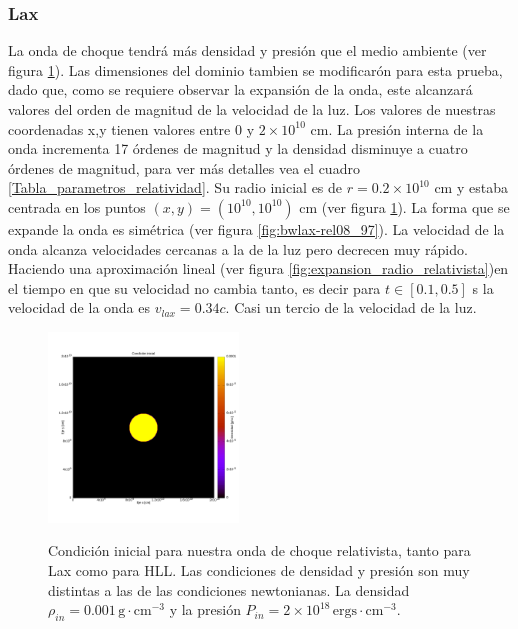 \documentclass[12pt,a4paper]{book}
\begin{document}
\subsubsection{Lax}
La onda de choque tendrá más densidad y presión que el medio ambiente (ver figura \ref{fig:Lax-relativista}). Las dimensiones del dominio tambien se modificarón para esta prueba, dado que, como se requiere observar la expansión de la onda, este alcanzará valores del orden de magnitud de la velocidad de la luz. Los valores de nuestras coordenadas x,y tienen valores entre $0$ y $2 \times 10^{10}$ cm. La presión interna de la onda incrementa 17 órdenes de magnitud y la densidad disminuye a cuatro órdenes de magnitud, para ver más detalles vea el cuadro \ref{Tabla_parametros_relatividad}.  Su radio inicial es de  $r = 0.2 \times 10^{10}$ cm y estaba centrada en los puntos $(x,y) = (10^{10}, 10^{10})$ cm (ver figura \ref{fig:Lax-relativista}). La forma que se expande la onda es simétrica (ver figura \ref{fig:bwlax-rel08_97}). La velocidad de la onda alcanza velocidades cercanas a la de la luz pero decrecen muy rápido. Haciendo una aproximación lineal (ver figura \ref{fig:expansion_radio_relativista})en el tiempo en que su velocidad no cambia tanto, es decir para $t \in [0.1, 0.5]$ s la velocidad de la onda es $v_{lax} = 0.34c$. Casi un tercio de la velocidad de la luz.

\begin{figure}
\centering
{\includegraphics[width=0.45\textwidth]{./Figuras/Pruebas/Prueba_onda_choque/Lax-HLL-rel/bwlax-rel00}}
\caption{\label{fig:Lax-relativista}Condición inicial para nuestra onda de choque relativista, tanto para Lax como para HLL. Las condiciones de densidad y presión son muy distintas a las de las condiciones newtonianas. La densidad $\rho_{in} = 0.001 \, \mathrm{g} \cdot \mathrm{cm}^{-3}$ y la presión $P_{in} = 2 \times 10^{18} \, \mathrm{ergs} \cdot \mathrm{cm}^{-3}$.}
\end{figure}
\end{document}
